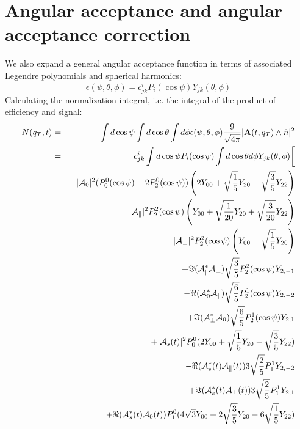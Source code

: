 \documentclass[a4paper,9pt,twosided]{article}
\begin{document}
\section{Angular acceptance and angular acceptance correction}
We also expand a general angular acceptance function in terms of associated Legendre polynomials and spherical harmonics:
\begin{equation}
   \epsilon(\psi,\theta,\phi) = c^{i}_{jk} P_i(\cos\psi)Y_{jk}(\theta,\phi)
   \label{eq:eps_exp}
\end{equation}
Calculating the normalization integral, i.e. the integral of the product of efficiency and signal:
\begin{eqnarray}
    N(q_T,t)  &=&  \int d\cos\psi\int d\cos\theta \int d\phi \epsilon(\psi,\theta,\phi) \frac{9}{\sqrt{4\pi}}|{\bf A}(t,q_T) \wedge \hat{n}|^2 \\
      &=& c^i_{jk} \int d\cos\psi   P_i(\cos\psi)  \int d\cos\theta d\phi Y_{jk}(\theta,\phi) 
          \biggl[  \\
          &&                  +|{\cal A}_0|^2  (P_0^0(\cos\psi)+2P_2^0(\cos\psi) ) \left( 2Y_{00}+\sqrt{\frac{1}{5}}Y_{20}-\sqrt{\frac{3}{5}}Y_{22} \right) \\
          &&                   |{\cal A}_\parallel|^2 P_2^2(\cos\psi) \left( Y_{00}+\sqrt{\frac{1}{20}}Y_{20}+\sqrt{\frac{3}{20}}Y_{22}  \right)  \\
          &&                  +|{\cal A}_\perp|^2  P_2^2(\cos\psi) \left( Y_{00} - \sqrt{\frac{1}{5}}Y_{20}\right)\\
          &&                  +\Im({\cal A}_\parallel^*{\cal A}_\perp)\sqrt{\frac{3}{5}}P_2^2(\cos\psi) Y_{2,-1}  \\
          &&                  -\Re({\cal A}_0^*{\cal A}_\parallel  )  \sqrt{\frac{6}{5}}P_2^1(\cos\psi) Y_{2,-2} \\
          &&                  +\Im({\cal A}_\perp^* {\cal A}_0 )      \sqrt{\frac{6}{5}}P_2^1(\cos\psi)Y_{2,1} \\
          &&                  +|{\cal A}_{s}(t)|^2  P_0^0 (2Y_{00} + \sqrt{\frac{1}{5}}Y_{20} -\sqrt{\frac{3}{5}} Y_{22}) \\
          &&                  -\Re({\cal A}_{s}^*(t){\cal A}_\parallel(t)) 3\sqrt{\frac{2}{5}} P_1^1 Y_{2,-2}\\
          &&                  +\Im({\cal A}_{s}^*(t){\cal A}_\perp(t)) 3\sqrt{\frac{2}{5}} P_1^1 Y_{2,1}\\
          &&                  +\Re({\cal A}_{s}^*(t){\cal A}_0(t)) P_1^0( 4\sqrt{3}  Y_{00} + 2 \sqrt{\frac{3}{5}} Y_{20} - 6 \sqrt{\frac{1}{5}}Y_{22})

\end{eqnarray}
\end{document}
